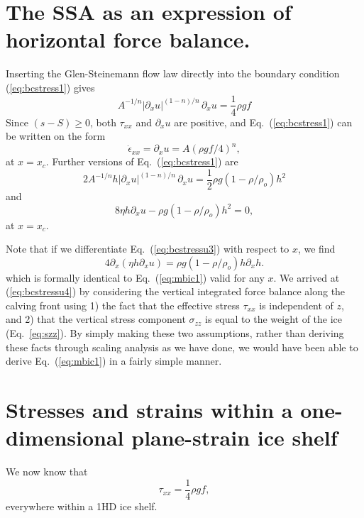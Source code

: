 \documentclass[10pt,a4paper]{book}
\begin{document}
\section{The SSA as an expression of horizontal force balance.}
Inserting the Glen-Steinemann flow law directly into the boundary
condition (\ref{eq:bcstress1}) gives
\[ 
A^{-1/n} | \partial_x u|^{(1-n)/n}\, \partial_x u = \frac{1}{4} \rho g f
\]
Since $(s-S) \ge 0$, both  $\tau_{xx}$ and $\partial_x u$ are positive,
and Eq.~(\ref{eq:bcstress1}) can  be written on the form
\begin{equation}
\dot{\epsilon}_{xx}=\partial_x u = A (\rho g f /4)^n ,
\label{eq:bcstressu2}
\end{equation}
at $x=x_c$.  Further versions of Eq.~(\ref{eq:bcstress1}) are
\begin{equation}
2 A^{-1/n} h | \partial_x u|^{(1-n)/n} \, \partial_x u = \frac{1}{2} \rho g (1-\rho/\rho_o) h^2
\label{eq:bcstressu}
\end{equation}
and
\begin{equation}
8 \eta h \partial_x u -\rho g (1-\rho/\rho_o) h^2 =0 ,
\label{eq:bcstressu3}
\end{equation}
at $x=x_c$.  


Note that if we differentiate Eq.~(\ref{eq:bcstressu3}) with respect to $x$, we find
\begin{equation}
4 \partial_x (\eta h \partial_x u ) = \rho g (1-\rho/\rho_o) h \partial_x h .
\label{eq:bcstressu4}
\end{equation}
which is formally identical to Eq.~(\ref{eq:mbic1}) valid for any $x$. We arrived at
(\ref{eq:bcstressu4}) by considering the vertical integrated force balance along the calving front
using 1) the fact that the effective stress $\tau_{xx}$ is independent of $z$, and 2) that the
vertical stress component $\sigma_{zz}$ is equal to the weight of the ice (Eq.~\ref{eq:szz}). By
simply making these two assumptions, rather than deriving these facts through scaling analysis as we
have done, we would have been able to derive Eq.~(\ref{eq:mbic1}) in a fairly simple manner.

\section{Stresses and strains within a one-dimensional plane-strain ice shelf}
We now know that 
\begin{equation}
\tau_{xx}=\frac{1}{4} \rho g f ,
\end{equation}
everywhere within a 1HD ice shelf.
\end{document}

